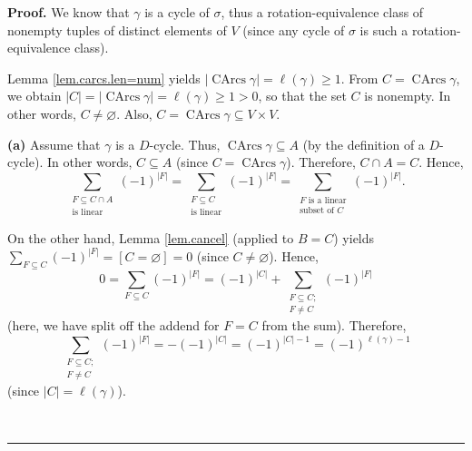 \documentclass[numbers=enddot,12pt,final,onecolumn,notitlepage]{scrartcl}%
\numberwithin{exer}{section}
\theoremstyle{definition}
\newenvironment{proof}[1][Proof]{\noindent\textbf{#1.} }{\ \rule{0.5em}{0.5em}}
\let\sumnonlimits\sum
\renewcommand{\sum}{\sumnonlimits\limits}
\newenvironment{verlong}{}{}
\begin{document}
\begin{verlong}
\begin{proof}
We know that $\gamma$ is a cycle of $\sigma$, thus a rotation-equivalence
class of nonempty tuples of distinct elements of $V$ (since any cycle of
$\sigma$ is such a rotation-equivalence class).

Lemma \ref{lem.carcs.len=num} yields $\left\vert \operatorname*{CArcs}%
\gamma\right\vert =\ell\left(  \gamma\right)  \geq1$. From
$C=\operatorname*{CArcs}\gamma$, we obtain $\left\vert C\right\vert
=\left\vert \operatorname*{CArcs}\gamma\right\vert =\ell\left(  \gamma\right)
\geq1>0$, so that the set $C$ is nonempty. In other words, $C\neq\varnothing$.
Also, $C=\operatorname*{CArcs}\gamma\subseteq V\times V$.\medskip

\textbf{(a)} Assume that $\gamma$ is a $D$-cycle. Thus, $\operatorname*{CArcs}%
\gamma\subseteq A$ (by the definition of a $D$-cycle). In other words,
$C\subseteq A$ (since $C=\operatorname*{CArcs}\gamma$). Therefore, $C\cap
A=C$. Hence,%
\begin{equation}
\sum_{\substack{F\subseteq C\cap A\\\text{is linear}}}\left(  -1\right)
^{\left\vert F\right\vert }=\sum_{\substack{F\subseteq C\\\text{is linear}%
}}\left(  -1\right)  ^{\left\vert F\right\vert }=\sum_{\substack{F\text{ is a
linear}\\\text{subset of }C}}\left(  -1\right)  ^{\left\vert F\right\vert }.
\label{pf.lem.carcs.linear2.1}%
\end{equation}


On the other hand, Lemma \ref{lem.cancel} (applied to $B=C$) yields
$\sum_{F\subseteq C}\left(  -1\right)  ^{\left\vert F\right\vert }=\left[
C=\varnothing\right]  =0$ (since $C\neq\varnothing$). Hence,%
\[
0=\sum_{F\subseteq C}\left(  -1\right)  ^{\left\vert F\right\vert }=\left(
-1\right)  ^{\left\vert C\right\vert }+\sum_{\substack{F\subseteq C;\\F\neq
C}}\left(  -1\right)  ^{\left\vert F\right\vert }%
\]
(here, we have split off the addend for $F=C$ from the sum). Therefore,%
\begin{equation}
\sum_{\substack{F\subseteq C;\\F\neq C}}\left(  -1\right)  ^{\left\vert
F\right\vert }=-\left(  -1\right)  ^{\left\vert C\right\vert }=\left(
-1\right)  ^{\left\vert C\right\vert -1}=\left(  -1\right)  ^{\ell\left(
\gamma\right)  -1} \label{pf.lem.carcs.linear2.2}%
\end{equation}
(since $\left\vert C\right\vert =\ell\left(  \gamma\right)  $).


\end{proof}
\end{verlong}
\end{document}

